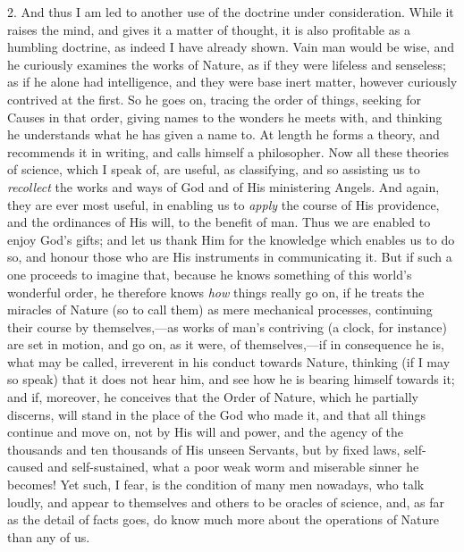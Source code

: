 2. And thus I am led to another use of the doctrine under
consideration. While it raises the mind, and gives it a matter of
thought, it is also profitable as a humbling doctrine, as indeed I have
already shown. Vain man would be wise, and he curiously examines the
works of Nature, as if they were lifeless and senseless; as if he alone
had intelligence, and they were base inert matter, however curiously
contrived at the first. So he goes on, tracing the order of things,
seeking for Causes in that order, giving names to the wonders he meets
with, and thinking he understands what he has given a name to. At length
he forms a theory, and recommends it in writing, and calls himself a
philosopher. Now all these theories of science, which I speak of, are
useful, as classifying, and so assisting us to \emph{recollect} the
works and ways of God and of His ministering Angels. And again, they are
ever most useful, in enabling us to \emph{apply} the course of His
providence, and the ordinances of His will, to the benefit of man. Thus
we are enabled to enjoy God's gifts; and let us thank Him for the
knowledge which enables us to do so, and honour those who are His
instruments in communicating it. But if such a one proceeds to imagine
that, because he knows something of this world's wonderful order, he
therefore knows \emph{how} things really go on, if he treats the
miracles of Nature (so to call them) as mere mechanical processes,
continuing their course by themselves,—as works of man's contriving (a
clock, for instance) are set in motion, and go on, as it were, of
themselves,—if in consequence he is, what may be called, irreverent in
his conduct towards Nature, thinking (if I may so speak) that it does
not hear him, and see how he is bearing himself towards it; and if,
moreover, he conceives that the Order of Nature, which he partially
discerns, will stand in the place of the God who made it, and that all
things continue and move on, not by His will and power, and the agency
of the thousands and ten thousands of His unseen Servants, but by fixed
laws, self-caused and self-sustained, what a poor weak worm and
miserable sinner he becomes! Yet such, I fear, is the condition of many
men nowadays, who talk loudly, and appear to themselves and others to
be
oracles of science, and, as far as the detail of facts goes, do know
much more about the operations of Nature than any of us.

